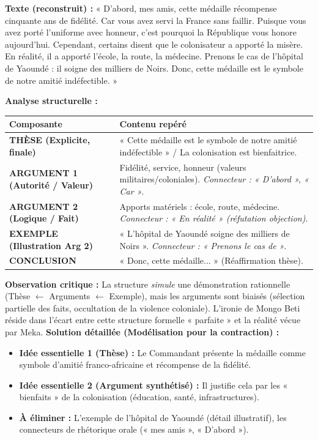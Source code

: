 \documentclass[11pt]{article}
\begin{document}
\begin{exoresolu}
\textbf{Texte (reconstruit) :} « D'abord, mes amis, cette médaille récompense cinquante ans de fidélité. Car vous avez servi la France sans faillir. Puisque vous avez porté l'uniforme avec honneur, c'est pourquoi la République vous honore aujourd'hui. Cependant, certains disent que le colonisateur a apporté la misère. En réalité, il a apporté l'école, la route, la médecine. Prenons le cas de l'hôpital de Yaoundé : il soigne des milliers de Noirs. Donc, cette médaille est le symbole de notre amitié indéfectible. »

\textbf{Analyse structurelle :}

\begin{center}
\begin{tabularx}{\linewidth}{|l|X|}\hline
\rowcolor{popblueL}
\textbf{Composante} & \textbf{Contenu repéré} \\ \hline
\textbf{THÈSE (Explicite, finale)} & « Cette médaille est le symbole de notre amitié indéfectible » / La colonisation est bienfaitrice. \\ \hline
\textbf{ARGUMENT 1 (Autorité / Valeur)} & Fidélité, service, honneur (valeurs militaires/coloniales). \textit{Connecteur : « D'abord », « Car »}. \\ \hline
\textbf{ARGUMENT 2 (Logique / Fait)} & Apports matériels : école, route, médecine. \textit{Connecteur : « En réalité » (réfutation objection)}. \\ \hline
\textbf{EXEMPLE (Illustration Arg 2)} & « L'hôpital de Yaoundé soigne des milliers de Noirs ». \textit{Connecteur : « Prenons le cas de »}. \\ \hline
\textbf{CONCLUSION} & « Donc, cette médaille... » (Réaffirmation thèse). \\ \hline
\end{tabularx}
\end{center}

\textbf{Observation critique :} La structure \emph{simule} une démonstration rationnelle (Thèse $\leftarrow$ Arguments $\leftarrow$ Exemple), mais les arguments sont biaisés (sélection partielle des faits, occultation de la violence coloniale). L'ironie de Mongo Beti réside dans l'écart entre cette structure formelle « parfaite » et la réalité vécue par Meka.
\tcblower
\textbf{Solution détaillée (Modélisation pour la contraction) :}
\begin{itemize}
    \item \textbf{Idée essentielle 1 (Thèse) :} Le Commandant présente la médaille comme symbole d'amitié franco-africaine et récompense de la fidélité.
    \item \textbf{Idée essentielle 2 (Argument synthétisé) :} Il justifie cela par les « bienfaits » de la colonisation (éducation, santé, infrastructures).
    \item \textbf{À éliminer :} L'exemple de l'hôpital de Yaoundé (détail illustratif), les connecteurs de rhétorique orale (« mes amis », « D'abord »).
\end{itemize}
\end{exoresolu}
\end{document}
